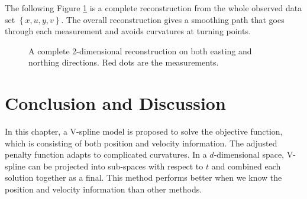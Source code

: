 The following Figure \ref{complete2DXY} is a complete reconstruction from the whole observed data set $\left\lbrace x,u,y,v\right\rbrace$. The overall reconstruction gives a smoothing path that goes through each measurement and avoids curvatures at turning points. 
\begin{figure}[h!]
\centering
{}
\caption{A complete 2-dimensional reconstruction on both easting and northing directions. Red dots are the measurements.}\label{complete2DXY}
\end{figure}



\section{Conclusion and Discussion}

In this chapter, a V-spline model is proposed to solve the objective function, which is consisting of both position and velocity information. The adjusted penalty function adapts to complicated curvatures. In a $d$-dimensional space, V-spline can be projected into sub-spaces with respect to $t$ and combined each solution together as a final. This method performs better when we know the position and velocity information than other methods. 

